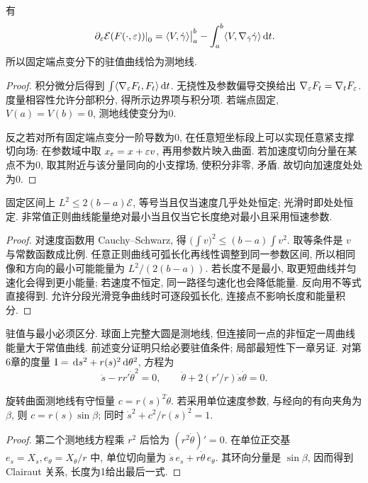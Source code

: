 \begin{theorem}[能量第一变分]\label{thm:first-energy}
有
\begin{equation}\label{eq:first-energy}
 \left.\partial_\varepsilon\mathcal E(F(\cdot,\varepsilon))\right|_0
 =\langle V,\dot\gamma\rangle\big|_a^b-
 \int_a^b\langle V,\nabla_{\dot\gamma}\dot\gamma\rangle\,\mathrm d t.
\end{equation}
所以固定端点变分下的驻值曲线恰为测地线.
\end{theorem}
\begin{proof}
积分微分后得到 $\int\langle\nabla_\varepsilon F_t,F_t\rangle\,\mathrm d t$. 无挠性及参数偏导交换给出 $\nabla_\varepsilon F_t=\nabla_tF_\varepsilon$. 度量相容性允许分部积分, 得所示边界项与积分项. 若端点固定, $V(a)=V(b)=0$, 测地线使变分为0.

反之若对所有固定端点变分一阶导数为0, 在任意短坐标段上可以实现任意紧支撑切向场: 在参数域中取 $x_\varepsilon=x+\varepsilon v$, 再用参数片映入曲面. 若加速度切向分量在某点不为0, 取其附近与该分量同向的小支撑场, 使积分非零, 矛盾. 故切向加速度处处为0.
\end{proof}
\begin{proposition}\label{prop:length-energy}
固定区间上 $L^2\le2(b-a)\mathcal E$, 等号当且仅当速度几乎处处恒定; 光滑时即处处恒定. 非常值正则曲线能量绝对最小当且仅当它长度绝对最小且采用恒速参数.
\end{proposition}
\begin{proof}
对速度函数用 Cauchy--Schwarz, 得 $\bigl(\int v\bigr)^2\le(b-a)\int v^2$. 取等条件是 $v$ 与常数函数成比例. 任意正则曲线可弧长化再线性调整到同一参数区间, 所以相同像和方向的最小可能能量为 $L^2/(2(b-a))$. 若长度不是最小, 取更短曲线并匀速化会得到更小能量; 若速度不恒定, 同一路径匀速化也会降低能量. 反向用不等式直接得到. 允许分段光滑竞争曲线时可逐段弧长化, 连接点不影响长度和能量积分.
\end{proof}
驻值与最小必须区分. 球面上完整大圆是测地线, 但连接同一点的非恒定一周曲线能量大于常值曲线. 前述变分证明只给必要驻值条件; 局部最短性下一章另证.
对第6章的度量 $\mathrm{I}=\,\mathrm d s^2+r(s)^2\,\mathrm d\theta^2$, 方程为
\[
 \ddot s-rr'\dot\theta^2=0,\qquad
 \ddot\theta+2(r'/r)\dot s\dot\theta=0.
\]
\begin{proposition}\label{prop:clairaut}
旋转曲面测地线有守恒量 $c=r(s)^2\dot\theta$. 若采用单位速度参数, 与经向的有向夹角为 $\beta$, 则 $c=r(s)\sin\beta$; 同时 $\dot s^2+c^2/r(s)^2=1$.
\end{proposition}
\begin{proof}
第二个测地线方程乘 $r^2$ 后恰为 $(r^2\dot\theta)'=0$. 在单位正交基 $e_s=X_s,e_\theta=X_\theta/r$ 中, 单位切向量为 $\dot s\,e_s+r\dot\theta\,e_\theta$. 其环向分量是 $\sin\beta$, 因而得到 Clairaut 关系, 长度为1给出最后一式.
\end{proof}
